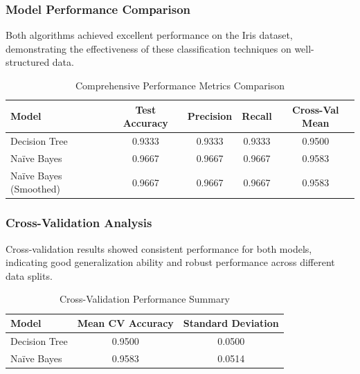 \documentclass[12pt,a4paper]{article}
\newcommand{\tablealtrow}{\rowcolor{tablealt1}}
\begin{document}
\subsubsection{Model Performance Comparison}

Both algorithms achieved excellent performance on the Iris dataset, demonstrating the effectiveness of these classification techniques on well-structured data.

\begin{table}[h!]
\centering
\renewcommand{\arraystretch}{1.4}
\begin{tabular}{|l|c|c|c|c|}
\hline
\rowcolor{tableheader}\textcolor{headertext}{\textbf{Model}} & \textcolor{headertext}{\textbf{Test Accuracy}} & \textcolor{headertext}{\textbf{Precision}} & \textcolor{headertext}{\textbf{Recall}} & \textcolor{headertext}{\textbf{Cross-Val Mean}} \\
\hline
\tablealtrow Decision Tree & 0.9333 & 0.9333 & 0.9333 & 0.9500 \\
\rowcolor{tablealt2} Na\"{i}ve Bayes & 0.9667 & 0.9667 & 0.9667 & 0.9583 \\
\tablealtrow Na\"{i}ve Bayes (Smoothed) & 0.9667 & 0.9667 & 0.9667 & 0.9583 \\
\hline
\end{tabular}
\caption{Comprehensive Performance Metrics Comparison}
\end{table}

\subsubsection{Cross-Validation Analysis}

Cross-validation results showed consistent performance for both models, indicating good generalization ability and robust performance across different data splits.

\begin{table}[h!]
\centering
\renewcommand{\arraystretch}{1.3}
\begin{tabular}{|l|c|c|}
\hline
\rowcolor{tableheader}\textcolor{headertext}{\textbf{Model}} & \textcolor{headertext}{\textbf{Mean CV Accuracy}} & \textcolor{headertext}{\textbf{Standard Deviation}} \\
\hline
\tablealtrow Decision Tree & 0.9500 & 0.0500 \\
\rowcolor{tablealt2} Na\"{i}ve Bayes & 0.9583 & 0.0514 \\
\hline
\end{tabular}
\caption{Cross-Validation Performance Summary}
\end{table}
\end{document}
